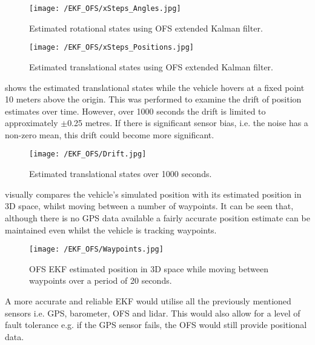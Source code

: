 \begin{figure}[htb]
\begin{center}
	\texttt{[image: /EKF\_OFS/xSteps\_Angles.jpg]}
	\end{center}
	\caption{Estimated rotational states using OFS extended Kalman filter.}%
	\label{fig:EKF_OFS_Results_Ang}%
\end{figure}

\begin{figure}[htb]
\begin{center}
	\texttt{[image: /EKF\_OFS/xSteps\_Positions.jpg]}
	\end{center}
	\caption{Estimated translational states using OFS extended Kalman filter.}%
	\label{fig:EKF_OFS_Results_Pos}%
\end{figure}

 shows the estimated translational states while the vehicle hovers at a fixed point 10 meters above the origin. This was performed to examine the drift of position estimates over time. However, over 1000 seconds the drift is limited to approximately $\pm$0.25 metres. If there is significant sensor bias, i.e. the noise has a non-zero mean, this drift could become more significant.
\begin{figure}[htb]
\begin{center}
	\texttt{[image: /EKF\_OFS/Drift.jpg]}\\
	\end{center}
	\caption{Estimated translational states over 1000 seconds.}%
	\label{fig:EKF_OFS_Drift}%
\end{figure}

 visually compares the vehicle's simulated position with its estimated position in 3D space, whilst moving between a number of waypoints. It can be seen that, although there is no GPS data available a fairly accurate position estimate can be maintained even whilst the vehicle is tracking waypoints.
\begin{figure}[htb]
\begin{center}
	\texttt{[image: /EKF\_OFS/Waypoints.jpg]}\\
	\end{center}
	\caption{OFS EKF estimated position in 3D space while moving between waypoints over a period of 20 seconds.}%
	\label{fig:EKF_OFS_3D}%
\end{figure}


A more accurate and reliable EKF would utilise all the previously mentioned sensors i.e. GPS, barometer, OFS and lidar. This would also allow for a level of fault tolerance e.g. if the GPS sensor fails, the OFS would still provide positional data.

